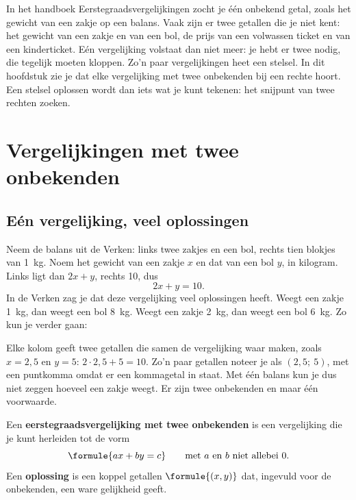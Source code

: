 In het handboek Eerstegraadsvergelijkingen zocht je één onbekend getal, zoals het gewicht van een zakje op een balans. Vaak zijn er twee getallen die je niet kent: het gewicht van een zakje en van een bol, de prijs van een volwassen ticket en van een kinderticket. Eén vergelijking volstaat dan niet meer: je hebt er twee nodig, die tegelijk moeten kloppen. Zo'n paar vergelijkingen heet een stelsel. In dit hoofdstuk zie je dat elke vergelijking met twee onbekenden bij een rechte hoort. Een stelsel oplossen wordt dan iets wat je kunt tekenen: het snijpunt van twee rechten zoeken.

\begin{oefeningen}[Start]

\end{oefeningen}

\section{Vergelijkingen met twee onbekenden}

\subsection{Eén vergelijking, veel oplossingen}

Neem de balans uit de Verken: links twee zakjes en een bol, rechts tien blokjes van 1~kg. Noem het gewicht van een zakje $x$ en dat van een bol $y$, in kilogram. Links ligt dan $2x + y$, rechts 10, dus
\[ 2x + y = 10 . \]
In de Verken zag je dat deze vergelijking veel oplossingen heeft. Weegt een zakje 1~kg, dan weegt een bol 8~kg. Weegt een zakje 2~kg, dan weegt een bol 6~kg. Zo kun je verder gaan:


Elke kolom geeft twee getallen die samen de vergelijking waar maken, zoals $x = 2{,}5$ en $y = 5$: $2 \cdot 2{,}5 + 5 = 10$. Zo'n paar getallen noteer je als $(2{,}5;\ 5)$, met een puntkomma omdat er een kommagetal in staat. Met één balans kun je dus niet zeggen hoeveel een zakje weegt. Er zijn twee onbekenden en maar één voorwaarde.

\begin{theorie}
Een \textbf{\textcolor{accent}{eerstegraadsvergelijking met twee onbekenden}} is een vergelijking die je kunt herleiden tot de vorm
\[ \formule{ax + by = c} \qquad \text{met $a$ en $b$ niet allebei 0.} \]
Een \textbf{\textcolor{accent}{oplossing}} is een koppel getallen $\formule{(x, y)}$ dat, ingevuld voor de onbekenden, een ware gelijkheid geeft.
\end{theorie}

